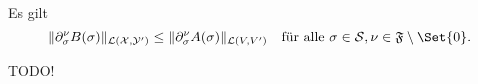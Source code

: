\begin{Lemma}
    \label{lemma:norm_B_beschraenkt_durch_norm_A}
    Es gilt
    \begin{equation}
        \norm{\partial^{\nu}_{\sigma} B(\sigma)}_{\mathcal L(\mathcal X, \mathcal Y')}
        \leq
        \norm{\partial^{\nu}_{\sigma} A(\sigma)}_{\mathcal L(V, V')}
        \quad
        \text{für alle}~\sigma \in \mathcal S, \nu \in \mathfrak F \setminus \Set{ 0 }.
    \end{equation}

    \begin{Beweis}
        TODO!
    \end{Beweis}
\end{Lemma}



